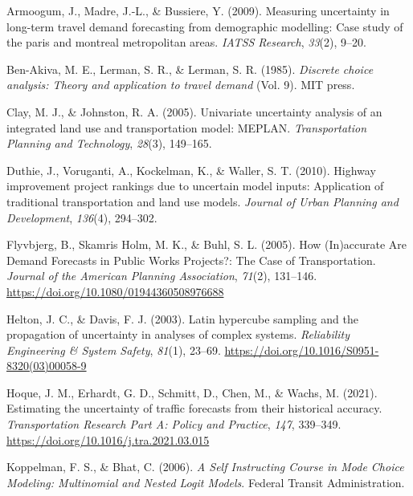 \documentclass[fancy, masters, twoside]{byuthesis}
\newlength{\cslhangindent}
\newlength{\cslentryspacingunit} %
\newenvironment{CSLReferences}[2] %
 {%
  \setlength{\parindent}{0pt}
  \ifodd #1
  \let\oldpar\par
  \def\par{\hangindent=\cslhangindent\oldpar}
  \fi
  \setlength{\parskip}{#2\cslentryspacingunit}
 }%
 {}
\begin{document}
\pagestyle{myrefs}

\hypertarget{refs}{}
\begin{CSLReferences}{1}{0}
\leavevmode{}%
Armoogum, J., Madre, J.-L., \& Bussiere, Y. (2009). Measuring uncertainty in long-term travel demand forecasting from demographic modelling: Case study of the paris and montreal metropolitan areas. \emph{IATSS Research}, \emph{33}(2), 9--20.

\leavevmode{}%
Ben-Akiva, M. E., Lerman, S. R., \& Lerman, S. R. (1985). \emph{Discrete choice analysis: Theory and application to travel demand} (Vol. 9). MIT press.

\leavevmode{}%
Clay, M. J., \& Johnston, R. A. (2005). Univariate uncertainty analysis of an integrated land use and transportation model: MEPLAN. \emph{Transportation Planning and Technology}, \emph{28}(3), 149--165.

\leavevmode{}%
Duthie, J., Voruganti, A., Kockelman, K., \& Waller, S. T. (2010). Highway improvement project rankings due to uncertain model inputs: Application of traditional transportation and land use models. \emph{Journal of Urban Planning and Development}, \emph{136}(4), 294--302.

\leavevmode{}%
Flyvbjerg, B., Skamris Holm, M. K., \& Buhl, S. L. (2005). How ({In})accurate {Are Demand Forecasts} in {Public Works Projects}?: {The Case} of {Transportation}. \emph{Journal of the American Planning Association}, \emph{71}(2), 131--146. \url{https://doi.org/10.1080/01944360508976688}

\leavevmode{}%
Helton, J. C., \& Davis, F. J. (2003). Latin hypercube sampling and the propagation of uncertainty in analyses of complex systems. \emph{Reliability Engineering \& System Safety}, \emph{81}(1), 23--69. \url{https://doi.org/10.1016/S0951-8320(03)00058-9}

\leavevmode{}%
Hoque, J. M., Erhardt, G. D., Schmitt, D., Chen, M., \& Wachs, M. (2021). Estimating the uncertainty of traffic forecasts from their historical accuracy. \emph{Transportation Research Part A: Policy and Practice}, \emph{147}, 339--349. \url{https://doi.org/10.1016/j.tra.2021.03.015}

\leavevmode{}%
Koppelman, F. S., \& Bhat, C. (2006). \emph{A {Self Instructing Course} in {Mode Choice Modeling}: {Multinomial} and {Nested Logit Models}}. {Federal Transit Administration}.


\end{CSLReferences}
\end{document}
